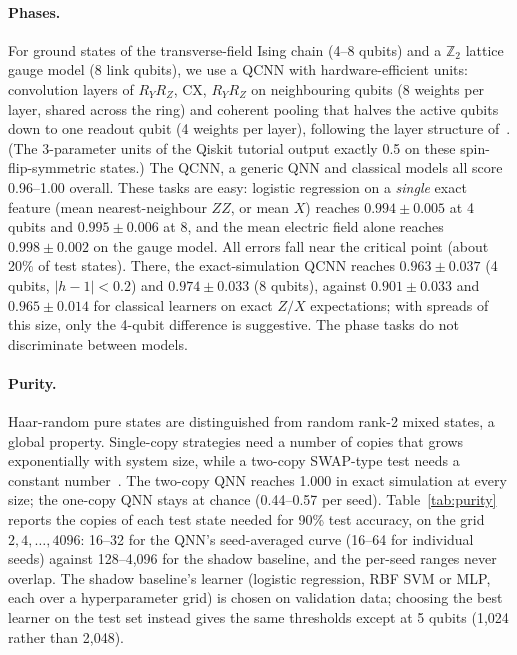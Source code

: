 \documentclass[11pt]{article}
\begin{document}
\paragraph{Phases.} For ground states of the transverse-field Ising chain (4--8 qubits) and a $\mathbb{Z}_2$ lattice gauge model (8 link qubits), we use a QCNN with hardware-efficient units: convolution layers of $R_Y R_Z$, CX, $R_Y R_Z$ on neighbouring qubits (8 weights per layer, shared across the ring) and coherent pooling that halves the active qubits down to one readout qubit (4 weights per layer), following the layer structure of~\cite{cong2019qcnn}. (The 3-parameter units of the Qiskit tutorial output exactly 0.5 on these spin-flip-symmetric states.) The QCNN, a generic QNN and classical models all score 0.96--1.00 overall. These tasks are easy: logistic regression on a \emph{single} exact feature (mean nearest-neighbour $ZZ$, or mean $X$) reaches $0.994 \pm 0.005$ at 4 qubits and $0.995 \pm 0.006$ at 8, and the mean electric field alone reaches $0.998 \pm 0.002$ on the gauge model. All errors fall near the critical point (about 20\% of test states). There, the exact-simulation QCNN reaches $0.963 \pm 0.037$ (4 qubits, $|h-1|<0.2$) and $0.974 \pm 0.033$ (8 qubits), against $0.901 \pm 0.033$ and $0.965 \pm 0.014$ for classical learners on exact $Z/X$ expectations; with spreads of this size, only the 4-qubit difference is suggestive. The phase tasks do not discriminate between models.

\paragraph{Purity.} Haar-random pure states are distinguished from random rank-2 mixed states, a global property. Single-copy strategies need a number of copies that grows exponentially with system size, while a two-copy SWAP-type test needs a constant number~\cite{huang2022experiments,chen2021memory}. The two-copy QNN reaches 1.000 in exact simulation at every size; the one-copy QNN stays at chance (0.44--0.57 per seed). Table~\ref{tab:purity} reports the copies of each test state needed for 90\% test accuracy, on the grid $2, 4, \dots, 4096$: 16--32 for the QNN's seed-averaged curve (16--64 for individual seeds) against 128--4{,}096 for the shadow baseline, and the per-seed ranges never overlap. The shadow baseline's learner (logistic regression, RBF SVM or MLP, each over a hyperparameter grid) is chosen on validation data; choosing the best learner on the test set instead gives the same thresholds except at 5 qubits (1{,}024 rather than 2{,}048).
\end{document}
